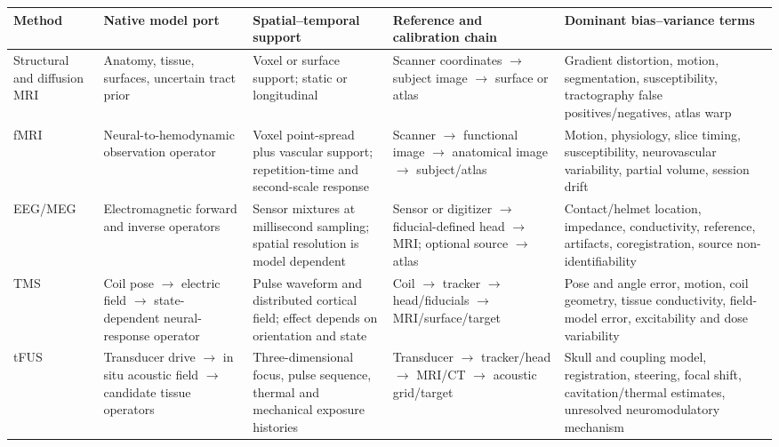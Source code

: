 \begin{table}[t]
\centering
\footnotesize
\setlength{\tabcolsep}{3.5pt}
\begin{tabularx}{\textwidth}{@{}p{}p{}p{}p{}X@{}}
\toprule
\textbf{Method} & \textbf{Native model port} &
\textbf{Spatial--temporal support} & \textbf{Reference and calibration chain} &
\textbf{Dominant bias--variance terms}\\
\midrule
Structural and diffusion MRI &
Anatomy, tissue, surfaces, uncertain tract prior &
Voxel or surface support; static or longitudinal &
Scanner coordinates \(\rightarrow\) subject image \(\rightarrow\) surface or atlas &
Gradient distortion, motion, segmentation, susceptibility, tractography false positives/negatives, atlas warp\\

fMRI &
Neural-to-hemodynamic observation operator &
Voxel point-spread plus vascular support; repetition-time and second-scale response &
Scanner \(\rightarrow\) functional image \(\rightarrow\) anatomical image \(\rightarrow\) subject/atlas &
Motion, physiology, slice timing, susceptibility, neurovascular variability, partial volume, session drift\\

EEG/MEG &
Electromagnetic forward and inverse operators &
Sensor mixtures at millisecond sampling; spatial resolution is model dependent &
Sensor or digitizer \(\rightarrow\) fiducial-defined head \(\rightarrow\) MRI; optional source \(\rightarrow\) atlas &
Contact/helmet location, impedance, conductivity, reference, artifacts, coregistration, source non-identifiability\\

TMS &
Coil pose \(\rightarrow\) electric field \(\rightarrow\) state-dependent neural-response operator &
Pulse waveform and distributed cortical field; effect depends on orientation and state &
Coil \(\rightarrow\) tracker \(\rightarrow\) head/fiducials \(\rightarrow\) MRI/surface/target &
Pose and angle error, motion, coil geometry, tissue conductivity, field-model error, excitability and dose variability\\

tFUS &
Transducer drive \(\rightarrow\) in situ acoustic field \(\rightarrow\) candidate tissue operators &
Three-dimensional focus, pulse sequence, thermal and mechanical exposure histories &
Transducer \(\rightarrow\) tracker/head \(\rightarrow\) MRI/CT \(\rightarrow\) acoustic grid/target &
Skull and coupling model, registration, steering, focal shift, cavitation/thermal estimates, unresolved neuromodulatory mechanism\\


\end{tabularx}
\end{table}
